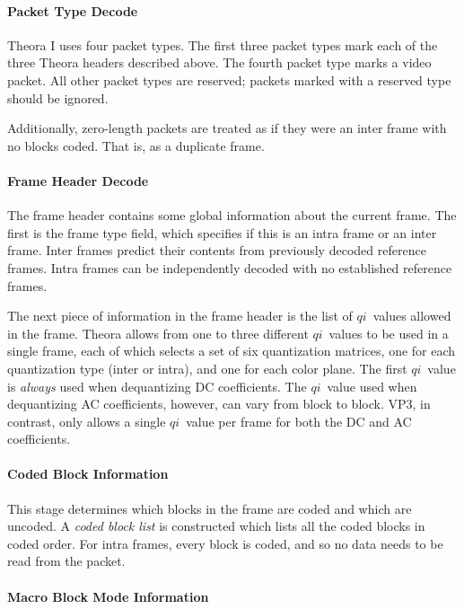 \documentclass[9pt,letterpaper]{book}
\newcommand{\idx}[1]{{\ensuremath{\mathit{#1}}}}
\newcommand{\qi}{\idx{qi}}
\newcommand{\term}[1]{{\em #1}}
\numberwithin{equation}{chapter}
\numberwithin{figure}{chapter}
\numberwithin{table}{chapter}
\begin{document}
\paragraph{Packet Type Decode}

Theora I uses four packet types.
The first three packet types mark each of the three Theora headers described
 above.
The fourth packet type marks a video packet.
All other packet types are reserved; packets marked with a reserved type should
 be ignored.

Additionally, zero-length packets are treated as if they were an inter 
frame with no blocks coded. That is, as a duplicate frame.

\paragraph{Frame Header Decode}

The frame header contains some global information about the current frame.
The first is the frame type field, which specifies if this is an intra frame or
 an inter frame.
Inter frames predict their contents from previously decoded reference frames.
Intra frames can be independently decoded with no established reference frames.

The next piece of information in the frame header is the list of \qi\ values
 allowed in the frame.
Theora allows from one to three different \qi\ values to be used in a single
 frame, each of which selects a set of six quantization matrices, one for each
 quantization type (inter or intra), and one for each color plane.
The first \qi\ value is {\em always} used when dequantizing DC coefficients.
The \qi\ value used when dequantizing AC coefficients, however, can vary from
 block to block.
VP3, in contrast, only allows a single \qi\ value per frame for both the DC and
 AC coefficients.

\paragraph{Coded Block Information}

This stage determines which blocks in the frame are coded and which are
 uncoded.
A \term{coded block list} is constructed which lists all the coded blocks in
 coded order.
For intra frames, every block is coded, and so no data needs to be read from
 the packet.

\paragraph{Macro Block Mode Information}
\end{document}
